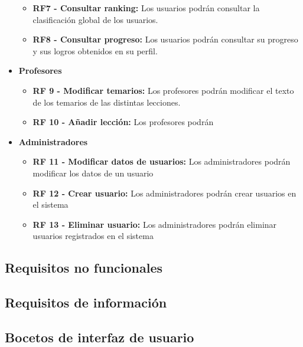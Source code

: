 \begin{itemize}
\begin{itemize}
        \item \textbf{RF7 - Consultar ranking: }Los usuarios podrán consultar la clasificación global de los usuarios.
        \item \textbf{RF8 - Consultar progreso: } Los usuarios podrán consultar su progreso y sus logros obtenidos en su perfil.
    \end{itemize}
    \item \textbf{Profesores}
    \begin{itemize}
        \item \textbf{RF 9 - Modificar temarios: }Los profesores podrán modificar el texto de los temarios de las distintas lecciones.
        \item \textbf{RF 10 - Añadir lección: }Los profesores podrán 
    \end{itemize}
    \item \textbf{Administradores}
    \begin{itemize}
        \item \textbf{RF 11 - Modificar datos de usuarios: }Los administradores podrán modificar los datos de un usuario
        \item \textbf{RF 12 - Crear usuario: }Los administradores podrán crear usuarios en el sistema
        \item \textbf{RF 13 - Eliminar usuario: }Los administradores podrán eliminar usuarios registrados en el sistema
    \end{itemize}
\end{itemize}
\subsection{Requisitos no funcionales}
\subsection{Requisitos de información}
\subsection{Bocetos de interfaz de usuario}